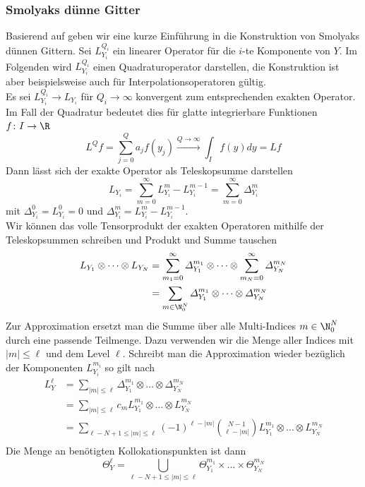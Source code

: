 \subsubsection*{Smolyaks dünne Gitter}
Basierend auf \autocite{ConradMarzouk} geben wir eine kurze Einführung in die Konstruktion von Smolyaks dünnen Gittern. Sei $L_{Y_i}^{Q_i}$ ein linearer Operator für die $i$-te Komponente von $Y$. Im Folgenden wird $L_{Y_i}^{Q_i}$ einen Quadraturoperator darstellen, die Konstruktion ist aber beispielsweise auch für Interpolationsoperatoren gültig.\\
Es sei $L_{Y_i}^{Q_i}\to L_{Y_i}$ für $Q_i\to\infty$ konvergent zum entsprechenden exakten Operator. Im Fall der Quadratur bedeutet dies für glatte integrierbare Funktionen $f\colon I\to\R$
\[L^Qf=\sum_{j=0}^Q a_jf(y_j)\xrightarrow[]{Q\to\infty}\int_If(y)dy=Lf\]
Dann lässt sich der exakte Operator als Teleskopsumme darstellen
\[L_{Y_i}=\sum_{m=0}^\infty L_{Y_i}^m - L_{Y_i}^{m-1}=\sum_{m=0}^\infty \varDelta_{Y_i}^m\]
mit $\varDelta_{Y_i}^0=L_{Y_i}^0=0$ und $\varDelta_{Y_i}^m=L_{Y_i}^m-L_{Y_i}^{m-1}$.\\
Wir können das volle Tensorprodukt der exakten Operatoren mithilfe der Teleskopsummen schreiben und Produkt und Summe tauschen
\begin{align*}
L_{Y_1}\otimes\dots\otimes L_{Y_N}&=\sum_{m_1=0}^\infty \varDelta_{Y_1}^{m_1}\otimes\dots\otimes \sum_{m_N=0}^\infty\varDelta_{Y_N}^{m_N}\\
&=\sum_{m\in\N_0^N} \varDelta_{Y_1}^{m_1}\otimes\dots\otimes \varDelta_{Y_N}^{m_N}\\
\end{align*}
Zur Approximation ersetzt man die Summe über alle Multi-Indices $m\in\N_0^N$ durch eine passende Teilmenge. Dazu verwenden wir die Menge aller Indices mit $|m|\le \ell$ und dem Level $\ell$. Schreibt man die Approximation wieder bezüglich der Komponenten $L_{Y_i}^{m_i}$ so gilt nach \autocite{NoTeWe07}
\begin{align*}
L_Y^\ell &= \sum_{|m|\le \ell} \varDelta_{Y_1}^{m_1}\otimes\dots\otimes \varDelta_{Y_N}^{m_N}\\
&= \sum_{|m|\le \ell} c_m L_{Y_1}^{m_1}\otimes\dots\otimes L_{Y_N}^{m_N}\\
&= \sum_{\ell - N+1\le |m|\le \ell} (-1)^{\ell - |m|}\binom{N-1}{\ell - |m|}L_{Y_1}^{m_1}\otimes\dots\otimes L_{Y_N}^{m_N}\\
\end{align*}
Die Menge an benötigten Kollokationspunkten ist dann 
\[\Theta_Y^\ell=\bigcup_{\ell - N+1\le |m|\le \ell} \Theta_{Y_1}^{m_1}\times\dots\times \Theta_{Y_N}^{m_N}\]
